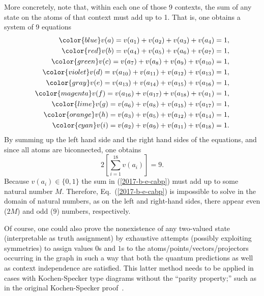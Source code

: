 {More concretely,  note that, within each one of those 9 contexts,
the sum of any state on the atoms of that context must add up to 1.
That is, %
one obtains a system of 9 equations
\begin{equation}
\begin{split}
\color{blue}        v(a)= v( a_1 ) + v( a_2 ) + v( a_3 ) + v( a_4 ) = 1 ,                  \\
\color{red}         v(b)= v( a_4 ) + v( a_5 ) + v( a_6 ) + v( a_7 ) = 1 ,                  \\
\color{green}       v(c)= v( a_7 ) + v( a_8 ) + v( a_9 ) + v( a_{10} ) = 1 ,               \\
\color{violet}      v(d)= v( a_{10} ) + v( a_{11} ) + v( a_{12} ) + v( a_{13} ) = 1 ,      \\
\color{gray}        v(e)= v( a_{13} ) + v( a_{14} ) + v( a_{15} ) + v( a_{16} ) = 1 ,      \\
\color{magenta}     v(f)= v( a_{16} ) + v( a_{17} ) + v( a_{18} ) + v( a_1 ) = 1 ,         \\
\color{lime}        v(g)= v( a_6 ) + v( a_8 ) + v( a_{15} ) + v( a_{17} ) = 1 ,            \\
\color{orange}      v(h)= v( a_3 ) + v( a_5 ) + v( a_{12} ) + v( a_{14} ) = 1 ,            \\
\color{cyan}        v(i)= v( a_2 ) + v( a_9 ) + v( a_{11} ) + v( a_{18} ) = 1 .
\label{2017-b-e-cabp-conf}
\end{split}
\end{equation}
By summing up the left hand side and the right hand sides of the equations, and since all atoms are biconnected,
one obtains
\begin{equation}
2 \left[\sum_{i=1}^{18} v(a_i)\right] = 9.
\label{2017-b-e-cabp}
\end{equation}
Because $v(a_i)\in \{0,1\}$ the sum in (\ref{2017-b-e-cabp}) must add up to some natural number $M$.
Therefore, Eq.~(\ref{2017-b-e-cabp}) is impossible to solve in the domain of natural numbers,
as on the left and right-hand sides, there appear even ($2M$) and odd ($9$) numbers, respectively.

Of course, one could also prove the nonexistence of any  two-valued state (interpretable as truth assignment)
by exhaustive attempts
(possibly exploiting symmetries) to assign values $0$s and $1$s to the atoms/points/vectors/projectors occurring in the graph
in such a way that both the quantum predictions as well as context independence are satisfied.
This latter method needs to be applied in cases with Kochen-Specker type diagrams without the  ``parity property;''
such as in the original Kochen-Specker proof~\cite[-20mm]{kochen1}.

\bproof
}


